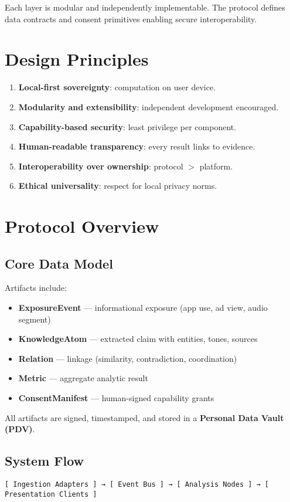 \documentclass[12pt]{article}
\begin{document}
Each layer is modular and independently implementable.  
The protocol defines data contracts and consent primitives enabling secure interoperability.

\section{Design Principles}
\begin{enumerate}
\item \textbf{Local-first sovereignty}: computation on user device.  
\item \textbf{Modularity and extensibility}: independent development encouraged.  
\item \textbf{Capability-based security}: least privilege per component.  
\item \textbf{Human-readable transparency}: every result links to evidence.  
\item \textbf{Interoperability over ownership}: protocol $>$ platform.  
\item \textbf{Ethical universality}: respect for local privacy norms.  
\end{enumerate}

\section{Protocol Overview}

\subsection{Core Data Model}
Artifacts include:
\begin{itemize}
\item \textbf{ExposureEvent} — informational exposure (app use, ad view, audio segment)
\item \textbf{KnowledgeAtom} — extracted claim with entities, tones, sources
\item \textbf{Relation} — linkage (similarity, contradiction, coordination)
\item \textbf{Metric} — aggregate analytic result
\item \textbf{ConsentManifest} — human-signed capability grants
\end{itemize}

All artifacts are signed, timestamped, and stored in a \textbf{Personal Data Vault (PDV)}.

\subsection{System Flow}
\begin{verbatim}
[ Ingestion Adapters ] → [ Event Bus ] → [ Analysis Nodes ] → [ Presentation Clients ]
\end{verbatim}
\end{document}
